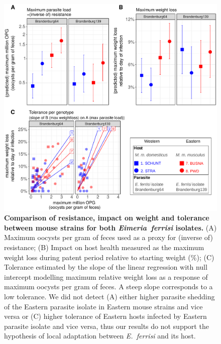 \documentclass[12pt]{article}
\begin{document}
\begin{figure}[H]
    \centering
    \includegraphics[width=\linewidth,height=\textheight,keepaspectratio]{images/Fig3_final.pdf}
    \caption{\textbf{Comparison of resistance, impact on weight and tolerance between mouse strains for both \textit{Eimeria~ferrisi} isolates.} (A) Maximum oocysts per gram of feces used as a proxy for (inverse of) resistance; (B) Impact on host health measured as the maximum weight loss during patent period relative to starting weight (\%); (C) Tolerance estimated by the slope of the linear regression with null intercept modelling maximum relative weight loss as a response of maximum oocysts per gram of feces. A steep slope corresponds to a low tolerance. We did not detect (A) either higher parasite shedding of the Eastern parasite isolate in Eastern mouse strains and vice versa or (C) higher tolerance of Eastern hosts infected by Eastern parasite isolate and vice versa, thus our results do not support the hypothesis of local adaptation between \textit{E.~ferrisi} and its host.}
\end{figure}
\end{document}
